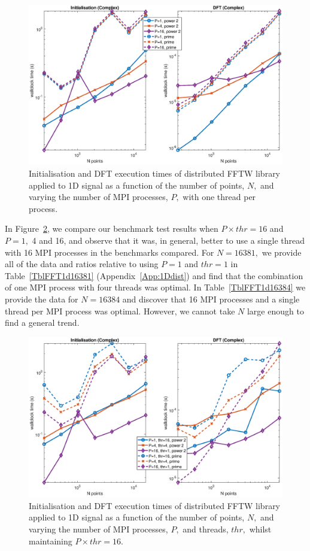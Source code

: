\documentclass[a4paper]{article}
\begin{document}
\begin{figure}[htb]
    \centering
    \includegraphics[width=0.9\linewidth]{../results/fftw_1d_mpi.eps}
  \caption{Initialisation and DFT execution times of distributed FFTW library applied to 1D signal as a function of the
    number of points, $N,$ and varying the number of MPI processes, $P,$ with one thread per process.}
  \label{1DDistFFTW}
\end{figure}

In Figure~\ref{1DDistFFTW16}, we compare our benchmark test results
when $P\times thr=16$ and $P=1,$ 4 and 16, and observe that it was, in
general, better to use a single thread with 16 MPI processes in the
benchmarks compared. For $N=16381,$ we provide all of the data and
ratios relative to using $P=1$ and $thr=1$ in
Table~\ref{TblFFT1d16381} (Appendix~\ref{App:1Ddist}) and find that the combination of one MPI
process with four threads was optimal. In Table~\ref{TblFFT1d16384}
we provide the data for $N=16384$ and discover that 16 MPI processes
and a single thread per MPI process was optimal. However, we cannot
take $N$ large enough to find a general trend.

\begin{figure}[htb]
    \centering
    \includegraphics[width=0.9\linewidth]{../results/fftw_1d_mpi_thr.eps}
  \caption{Initialisation and DFT execution times of distributed FFTW library applied to 1D signal as a function of the
    number of points, $N,$ and varying the number of MPI processes, $P,$ and threads, $thr,$ whilst maintaining $P\times thr=16.$}
  \label{1DDistFFTW16}
\end{figure}
\end{document}

